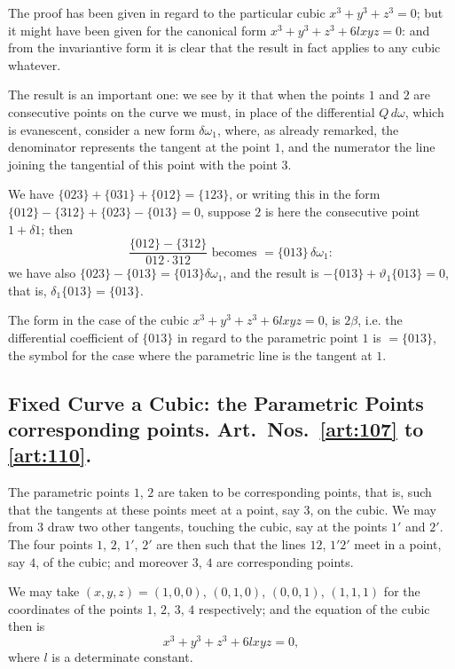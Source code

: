 \documentclass[11pt,a4paper]{book}
\begin{document}
\begin{art}\label{art:105}
The proof has been given in regard to the particular cubic $x^3 + y^3 + z^3 = 0$; but it might have been given for the canonical form $x^3 + y^3 + z^3 + 6lxyz = 0$: and from the invariantive form it is clear that the result in fact applies to any cubic whatever.

The result is an important one: we see by it that when the points $1$ and $2$ are consecutive points on the curve we must, in place of the differential $Q\,d\omega$, which is evanescent, consider a new form $\delta\omega_1$, where, as already remarked, the denominator represents the tangent at the point $1$, and the numerator the line joining the tangential of this point with the point $3$.
\end{art}

\begin{art}\label{art:106}
We have $\{023\} + \{031\} + \{012\} = \{123\}$, or writing this in the form $\{012\} - \{312\} + \{023\} - \{013\} = 0$, suppose $2$ is here the consecutive point $1 + \delta 1$; then
\[
\frac{\{012\} - \{312\}}{012 \cdot 312} \text{ becomes } = \{013\}\,\delta\omega_1:
\]
we have also $\{023\} - \{013\} = \{013\}\delta\omega_1$, and the result is $-\{013\} + \vartheta_1\{013\} = 0$, that is, $\delta_1\{013\} = \{013\}$.

The form in the case of the cubic $x^3 + y^3 + z^3 + 6lxyz = 0$, is $2\beta$, i.e. the differential coefficient of $\{013\}$ in regard to the parametric point $1$ is $= \{013\}$, the symbol for the case where the parametric line is the tangent at $1$.
\end{art}

\newpage
\subsection*{Fixed Curve a Cubic: the Parametric Points corresponding points. Art.~Nos.~\ref{art:107} to \ref{art:110}.}

\begin{art}\label{art:107}
The parametric points $1$, $2$ are taken to be corresponding points, that is, such that the tangents at these points meet at a point, say $3$, on the cubic. We may from $3$ draw two other tangents, touching the cubic, say at the points $1'$ and $2'$. The four points $1$, $2$, $1'$, $2'$ are then such that the lines $12$, $1'2'$ meet in a point, say $4$, of the cubic; and moreover $3$, $4$ are corresponding points.

We may take $(x, y, z) = (1, 0, 0)$, $(0, 1, 0)$, $(0, 0, 1)$, $(1, 1, 1)$ for the coordinates of the points $1$, $2$, $3$, $4$ respectively; and the equation of the cubic then is
\[
x^3 + y^3 + z^3 + 6lxyz = 0,
\]
where $l$ is a determinate constant.
\end{art}
\end{document}
